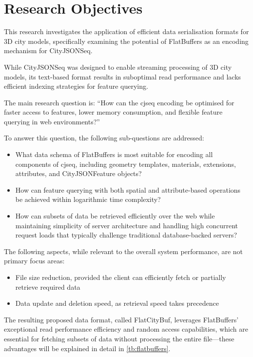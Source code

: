\section{Research Objectives}
\label{introduction:research_objectives}
This research investigates the application of efficient data serialisation formats for 3D city models, specifically examining the potential of FlatBuffers \citep{flatbuffers} as an encoding mechanism for CityJSONSeq.

While CityJSONSeq was designed to enable streaming processing of 3D city models, its text-based format results in suboptimal read performance and lacks efficient indexing strategies for feature querying.

The main research question is:
``How can the \ac{cjseq} encoding be optimised for faster access to features, lower memory consumption, and flexible feature querying in web environments?''

To answer this question, the following sub-questions are addressed:
\begin{itemize}
  \item What data schema of FlatBuffers is most suitable for encoding all components of \ac{cjseq}, including geometry templates, materials, extensions, attributes, and CityJSONFeature objects?
  \item How can feature querying with both spatial and attribute-based operations be achieved within logarithmic time complexity?
  \item How can subsets of data be retrieved efficiently over the web while maintaining simplicity of server architecture and handling high concurrent request loads that typically challenge traditional database-backed servers?
\end{itemize}

The following aspects, while relevant to the overall system performance, are not primary focus areas:
\begin{itemize}
  \item File size reduction, provided the client can efficiently fetch or partially retrieve required data
  \item Data update and deletion speed, as retrieval speed takes precedence
\end{itemize}

The resulting proposed data format, called FlatCityBuf, leverages FlatBuffers' exceptional read performance efficiency and random access capabilities, which are essential for fetching subsets of data without processing the entire file—these advantages will be explained in detail in \autoref{tb:flatbuffers}.

